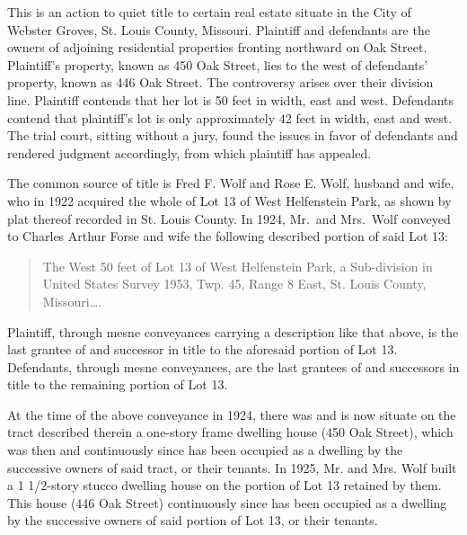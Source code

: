 
This is an action to quiet title to certain real estate situate in the City of
Webster Groves, St. Louis County, Missouri. Plaintiff and defendants are the
owners of adjoining residential properties fronting northward on Oak Street.
Plaintiff's property, known as 450 Oak Street, lies to the west of defendants'
property, known as 446 Oak Street. The controversy arises over their division
line. Plaintiff contends that her lot is 50 feet in width, east and west.
Defendants contend that plaintiff's lot is only approximately 42 feet in width,
east and west. The trial court, sitting without a jury, found the issues in
favor of defendants and rendered judgment accordingly, from which plaintiff has
appealed.


The common source of title is Fred F. Wolf and Rose E. Wolf, husband and wife,
who in 1922 acquired the whole of Lot 13 of West Helfenstein Park, as shown by
plat thereof recorded in St. Louis County. In 1924, Mr.~and Mrs.~Wolf conveyed
to Charles Arthur Forse and wife the following described portion of said Lot
13: 
\begin{quote}
The West 50 feet of Lot 13 of West Helfenstein Park, a Sub-division in United
States Survey 1953, Twp. 45, Range 8 East, St. Louis County, Missouri\ldots.
\end{quote}
Plaintiff, through mesne conveyances carrying a description like that above, is
the last grantee of and successor in title to the aforesaid portion of Lot 13.
Defendants, through mesne conveyances, are the last grantees of and successors
in title to the remaining portion of Lot 13. 

At the time of the above conveyance in 1924, there was and is now situate on the
tract described therein a one-story frame dwelling house (450 Oak Street),
which was then and continuously since has been occupied as a dwelling by the
successive owners of said tract, or their tenants. In 1925, Mr. and Mrs. Wolf
built a 1 1/2-story stucco dwelling house on the portion of Lot 13 retained by
them. This house (446 Oak Street) continuously since has been occupied as a
dwelling by the successive owners of said portion of Lot 13, or their tenants. 

